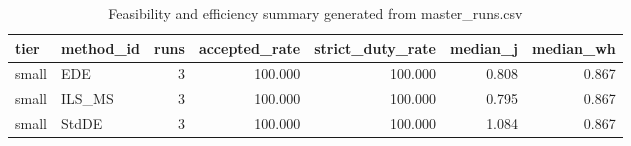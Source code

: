 \begin{table}[!t]
\centering
\caption{Feasibility and efficiency summary generated from master_runs.csv}
\label{tab:feasibility_summary_generated}
\begin{tabular}{llrrrrr}
\toprule
tier & method_id & runs & accepted_rate & strict_duty_rate & median_j & median_wh \\
\midrule
small & EDE & 3 & 100.000 & 100.000 & 0.808 & 0.867 \\
small & ILS_MS & 3 & 100.000 & 100.000 & 0.795 & 0.867 \\
small & StdDE & 3 & 100.000 & 100.000 & 1.084 & 0.867 \\
\bottomrule
\end{tabular}

\end{table}